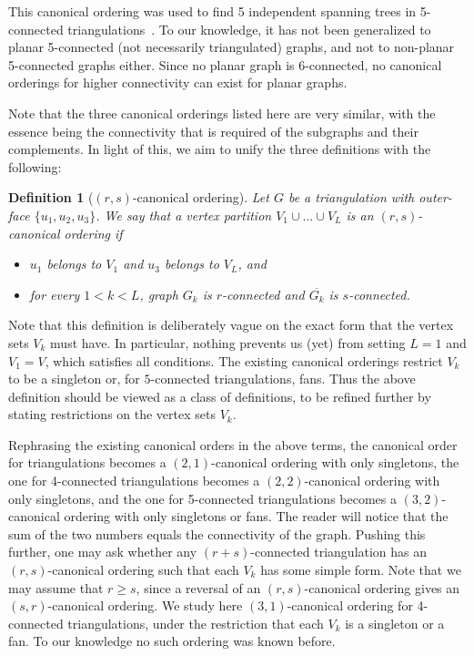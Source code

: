\documentclass[12pt]{article}
\newtheorem{definition}{Definition}
\begin{document}
This canonical ordering was used to find 5 independent spanning trees in 5-connected triangulations~\cite{NN00}. To our knowledge, it has not been generalized to planar 5-connected (not necessarily triangulated) graphs, and not to non-planar 5-connected graphs either.    Since no planar graph is 6-connected, no canonical orderings for higher connectivity can exist for planar graphs.

Note that the three canonical orderings listed here are very similar, with the essence being the
connectivity that is required of the subgraphs and their complements.
In light of this, we 
aim to unify the three definitions with the following:

\begin{definition}[$(r,s)$-canonical ordering]
Let $G$ be a triangulation with outer-face $\{u_1,u_2,u_3\}$.
We say that 
a vertex partition $V_1 \cup \ldots \cup V_L$ 
is an \emph{$(r,s)$-canonical ordering} if 
\begin{itemize}
\item $u_1$ belongs to $V_1$ and $u_3$ belongs to $V_L$, and
\item for every $1 < k < L$, graph $G_k$ is $r$-connected and $\overline{G_k}$ is $s$-connected.
\end{itemize}
\end{definition}

Note that this definition is deliberately vague on the exact form that the vertex sets $V_k$ must have.
In particular, nothing prevents us (yet) from setting $L=1$ and $V_1=V$, which satisfies all conditions.
The existing canonical orderings restrict $V_k$ to be a singleton or, for $5$-connected triangulations, fans.
Thus the above definition should be viewed as a class of definitions, to be refined further by
stating restrictions on the vertex sets $V_k$.

Rephrasing the existing canonical orders in the above terms,
the canonical order for triangulations becomes a $(2,1)$-canonical ordering with only singletons, the one for 4-connected triangulations becomes a $(2,2)$-canonical ordering with only singletons, and the one for 5-connected triangulations becomes a $(3,2)$-canonical ordering with only singletons or fans. The reader will notice that the sum of the two numbers equals the connectivity of the graph.  Pushing this further, one may ask whether any $(r{+}s)$-connected
triangulation has an $(r,s)$-canonical ordering such that each $V_k$ has some simple form.
Note that we may assume that $r\geq s$, since a reversal of an $(r,s)$-canonical ordering gives an $(s,r)$-canonical ordering.
We study here $(3,1)$-canonical ordering for 4-connected triangulations, under the restriction that each $V_k$ is a singleton or a fan.
To our knowledge no such ordering was known before.
\end{document}
